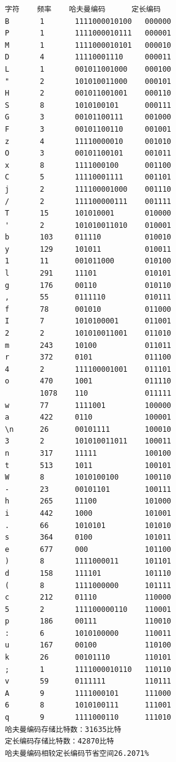 \documentclass[lang=cn,11pt,a4paper]{elegantpaper}
\begin{document}
\begin{lstlisting}[language=text]
字符    频率    哈夫曼编码      定长编码
B       1       1111000010100   000000
P       1       1111000010111   000001
M       1       1111000010101   000010
D       4       11110001110     000011
L       1       001011001000    000100
"       2       101010011000    000101
H       2       001011001001    000110
S       8       1010100101      000111
G       3       00101100111     001000
F       3       00101100110     001001
z       4       11110000010     001010
O       3       00101100101     001011
x       8       1111000100      001100
C       5       11110001111     001101
j       2       111100001000    001110
/       2       111100000111    001111
T       15      101010001       010000
'       2       101010011010    010001
b       103     011110          010010
y       129     101011          010011
1       11      001011000       010100
l       291     11101           010101
g       176     00110           010110
,       55      0111110         010111
f       78      001010          011000
I       7       1010100001      011001
2       2       101010011001    011010
m       243     10100           011011
r       372     0101            011100
4       2       111100001001    011101
o       470     1001            011110
        1078    110             011111
w       77      1111001         100000
a       422     0110            100001
\n      26      00101111        100010
3       2       101010011011    100011
n       317     11111           100100
t       513     1011            100101
W       8       1010100100      100110
-       23      00101101        100111
h       265     11100           101000
i       442     1000            101001
.       66      1010101         101010
s       364     0100            101011
e       677     000             101100
)       8       1111000011      101101
d       158     111101          101110
(       8       1111000000      101111
c       212     01110           110000
5       2       111100000110    110001
p       186     00111           110010
:       6       1010100000      110011
u       167     00100           110100
k       26      00101110        110101
;       1       1111000010110   110110
v       59      0111111         110111
A       9       1111000101      111000
6       8       1010100111      111001
q       9       1111000110      111010
哈夫曼编码存储比特数：31635比特
定长编码存储比特数：42870比特
哈夫曼编码相较定长编码节省空间26.2071%
\end{lstlisting}
\end{document}
